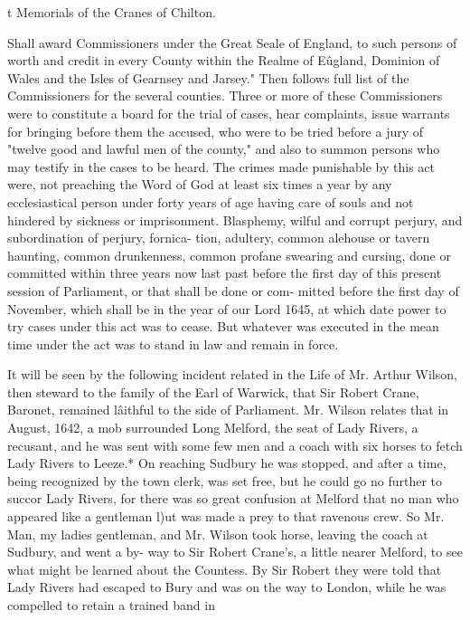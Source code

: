 t Memorials of the Cranes of Chilton. 




Shall award Commissioners under the Great Seale of England, 
to such persons of worth and credit in every County within the 
Realme of E\^ugland, Dominion of Wales and the Isles of Gearnsey 
and Jarsey." Then follows full list of the Commissioners for the 
several counties. Three or more of these Commissioners were to 
constitute a board for the trial of cases, hear complaints, issue 
warrants for bringing before them the accused, who were to be 
tried before a jury of "twelve good and lawful men of the 
county," and also to summon persons who may testify in the 
cases to be heard. The crimes made punishable by this act were, 
not preaching the Word of God at least six times a year by any 
ecclesiastical person under forty years of age having care of souls 
and not hindered by sickness or imprisonment. Blasphemy, 
wilful and corrupt perjury, and subordination of perjury, fornica- 
tion, adultery, common alehouse or tavern haunting, common 
drunkenness, common profane swearing and cursing, done or 
committed within three years now last past before the first day of 
this present session of Parliament, or that shall be done or com- 
mitted before the first day of November, which shall be in the 
year of our Lord 1645, at which date power to try cases under 
this act was to cease. But whatever was executed in the mean 
time under the act was to stand in law and remain in force. 

It will be seen by the following incident related in the Life of 
Mr. Arthur Wilson, then steward to the family of the Earl of 
Warwick, that Sir Robert Crane, Baronet, remained l\^aithful to 
the side of Parliament. Mr. Wilson relates that in August, 1642, 
a mob surrounded Long Melford, the seat of Lady Rivers, a 
recusant, and he was sent with some few men and a coach with 
six horses to fetch Lady Rivers to Leeze.* On reaching Sudbury 
he was stopped, and after a time, being recognized by the town 
clerk, was set free, but he could go no further to succor Lady 
Rivers, for there was so great confusion at Melford that no man 
who appeared like a gentleman l)ut was made a prey to that 
ravenous crew. So Mr. Man, my ladies gentleman, and Mr. 
Wilson took horse, leaving the coach at Sudbury, and went a by- 
way to Sir Robert Crane's, a little nearer Melford, to see what 
might be learned about the Countess. By Sir Robert they were 
told that Lady Rivers had escaped to Bury and was on the way 
to London, while he was compelled to retain a trained band in 



